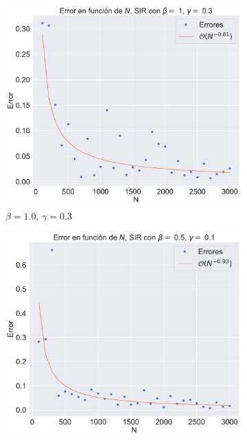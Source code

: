 \begin{figure}[h]
    \centering
    \begin{subfigure}[b]{0.32\textwidth}
        \centering
        \includegraphics[width=\textwidth]{img/content/chapter3/SIR1Errors.pdf}
        \caption{$\beta=1.0$, $\gamma=0.3$}
    \end{subfigure}
    \hfill
    \begin{subfigure}[b]{0.32\textwidth}
        \centering
        \includegraphics[width=\textwidth]{img/content/chapter3/SIR2Errors.pdf}

\end{subfigure}
\end{figure}
